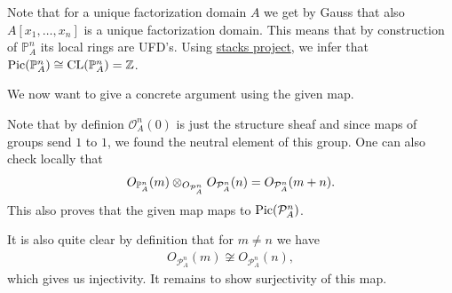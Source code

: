 \begin{exercise}{2}
    Note that for a unique factorization domain $A$ we get by Gauss that also
    $A[x_1,\dots, x_n]$ is a unique factorization domain. This means that by
    construction of $\mathbb{P}_A^n$ its local rings are UFD's. Using
    \href{https://stacks.math.columbia.edu/tag/0BE9}{stacks project}, we infer
    that $\operatorname{Pic}(\mathbb{P}_A^n)\cong \operatorname{CL}(\mathbb{P}_A^n)=\mathbb{Z}$.

    We now want to give a concrete argument using the given map.

    Note that by definion $\mathcal{O}^n_A(0)$ is just the structure sheaf and
    since maps of groups send $1$ to $1$, we found the neutral element of this
    group. One can also check locally that 
    \begin{align*}
       O_{\mathbb{P}^n_A}(m)\otimes_{O_{\mathcal{P}^n_A}} O_{\mathcal{P}^n_A}(n) =
        O_{\mathcal{P}^n_A}(m+n).
    \end{align*}
    This also proves that the given map maps to $\operatorname{Pic}(\mathcal{P}^n_A)$.

    It is also quite clear by definition that for $m\not=n$ we have
    \begin{align*}
        O_{\mathcal{P}^n_A}(m)\not \cong O_{\mathcal{P}^n_A}(n),
    \end{align*}
    which gives us injectivity.
    It remains to show surjectivity of this map.
\end{exercise}


